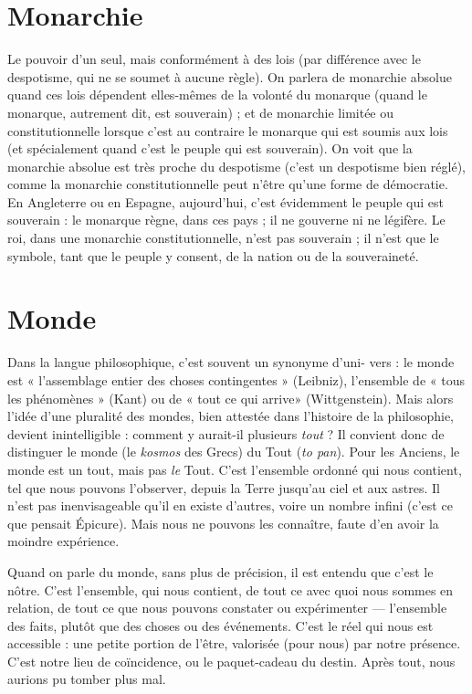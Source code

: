 \section{Monarchie}
Le pouvoir d’un seul, mais conformément à des lois (par différence
avec le despotisme, qui ne se soumet à aucune règle).
On parlera de monarchie absolue quand ces lois dépendent elles-mêmes de la
volonté du monarque (quand le monarque, autrement dit, est souverain) ; et de
monarchie limitée ou constitutionnelle lorsque c’est au contraire le monarque
qui est soumis aux lois (et spécialement quand c’est le peuple qui est souverain).
On voit que la monarchie absolue est très proche du despotisme (c’est un
despotisme bien réglé), comme la monarchie constitutionnelle peut n'être
qu’une forme de démocratie. En Angleterre ou en Espagne, aujourd’hui, c’est
évidemment le peuple qui est souverain : le monarque règne, dans ces pays ; il
ne gouverne ni ne légifère. Le roi, dans une monarchie constitutionnelle, n’est
pas souverain ; il n’est que le symbole, tant que le peuple y consent, de la
nation ou de la souveraineté.

\section{Monde}
Dans la langue philosophique, c’est souvent un synonyme d’uni-
vers : le monde est « l’assemblage entier des choses contingentes »
(Leibniz), l’ensemble de « tous les phénomènes » (Kant) ou de « tout ce qui
arrive» (Wittgenstein). Mais alors l’idée d’une pluralité des mondes, bien
attestée dans l’histoire de la philosophie, devient inintelligible : comment y
aurait-il plusieurs {\it tout} ? Il convient donc de distinguer le monde (le {\it kosmos} des
Grecs) du Tout ({\it to pan}). Pour les Anciens, le monde est un tout, mais pas {\it le}
Tout. C’est l’ensemble ordonné qui nous contient, tel que nous pouvons
l’observer, depuis la Terre jusqu’au ciel et aux astres. Il n’est pas inenvisageable
qu’il en existe d’autres, voire un nombre infini (c’est ce que pensait Épicure).
Mais nous ne pouvons les connaître, faute d’en avoir la moindre expérience.

Quand on parle du monde, sans plus de précision, il est entendu que c’est
le nôtre. C’est l’ensemble, qui nous contient, de tout ce avec quoi nous sommes
en relation, de tout ce que nous pouvons constater ou expérimenter —
l’ensemble des faits, plutôt que des choses ou des événements. C’est le réel qui
nous est accessible : une petite portion de l’être, valorisée (pour nous) par notre
présence. C’est notre lieu de coïncidence, ou le paquet-cadeau du destin. Après
tout, nous aurions pu tomber plus mal.

